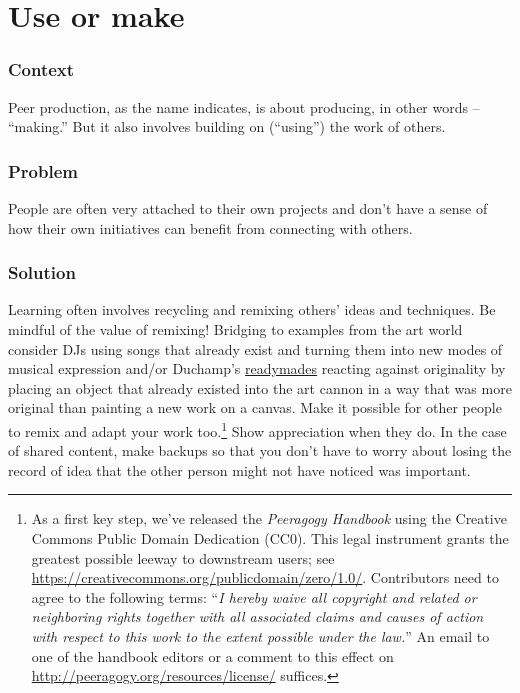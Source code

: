\section{Use or make}\label{sec:Use_or_make}
\subsubsection*{Context}
Peer production, as the name indicates, is about producing, in other words --
``making.'' But it also involves building on (``using'') the work of others.

\subsubsection*{Problem}
People are often very attached to their own projects and don't have a sense of how their own initiatives can benefit from connecting with others.

\subsubsection*{Solution} Learning often involves recycling and remixing others' ideas and techniques. Be mindful of the value of remixing!  Bridging to examples from the art world consider DJs using songs that already exist and turning them into new modes of musical expression and/or Duchamp's {\href{https://en.wikipedia.org/w/index.php?title=Readymades_of_Marcel_Duchamp&oldid=660437742}{readymades}} reacting against originality by placing an object that already existed into the art cannon in a way that was more original than painting a new work on a canvas.  Make it possible for other people to remix and adapt your work too.\footnote{As a first key step, we've released the \emph{Peeragogy Handbook} using the Creative Commons Public Domain Dedication (CC0).  This legal instrument grants the greatest possible leeway to downstream users; see \url{https://creativecommons.org/publicdomain/zero/1.0/}.  Contributors need to agree to the following terms: ``\emph{I hereby waive all copyright and related or neighboring rights together with all associated claims and causes of action with respect to this work to the extent possible under the law.}''  An email to one of the handbook editors or a comment to this effect on \url{http://peeragogy.org/resources/license/} suffices.}  Show appreciation when they do.  In the case of shared content, make backups so that you don't have to worry about losing the record of idea that the other person might not have noticed was important.

